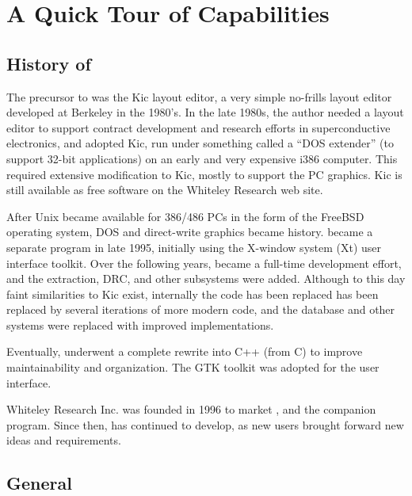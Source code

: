 \section{A Quick Tour of {\Xic} Capabilities}

\subsection{History of {\Xic}}

The precursor to {\Xic} was the Kic layout editor, a very simple
no-frills layout editor developed at Berkeley in the 1980's.  In the
late 1980s, the author needed a layout editor to support contract
development and research efforts in superconductive electronics, and
adopted Kic, run under something called a ``DOS extender'' (to support
32-bit applications) on an early and very expensive i386 computer. 
This required extensive modification to Kic, mostly to support the PC
graphics.  Kic is still available as free software on the Whiteley
Research web site.

After Unix became available for 386/486 PCs in the form of the FreeBSD
operating system, DOS and direct-write graphics became history. 
{\Xic} became a separate program in late 1995, initially using the
X-window system (Xt) user interface toolkit.  Over the following
years, {\Xic} became a full-time development effort, and the
extraction, DRC, and other subsystems were added.  Although to this
day faint similarities to Kic exist, internally the code has been
replaced has been replaced by several iterations of more modern code,
and the database and other systems were replaced with improved
implementations.

Eventually, {\Xic} underwent a complete rewrite into C++ (from C) to
improve maintainability and organization.  The GTK toolkit was
adopted for the user interface.

Whiteley Research Inc.  was founded in 1996 to market {\Xic}, and the
companion {\WRspice} program.  Since then, {\Xic} has continued to
develop, as new users brought forward new ideas and requirements.

\subsection{General}

